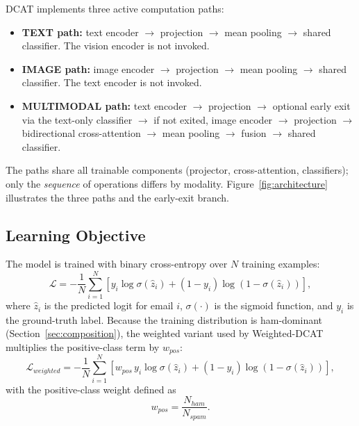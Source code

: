 \documentclass[10pt,twoside]{article}
\begin{document}
DCAT implements three active computation paths:

\begin{itemize}
\item \textbf{TEXT path:} text encoder $\rightarrow$ projection $\rightarrow$ mean pooling $\rightarrow$ shared classifier. The vision encoder is not invoked.
\item \textbf{IMAGE path:} image encoder $\rightarrow$ projection $\rightarrow$ mean pooling $\rightarrow$ shared classifier. The text encoder is not invoked.
\item \textbf{MULTIMODAL path:} text encoder $\rightarrow$ projection $\rightarrow$ optional early exit via the text-only classifier $\rightarrow$ if not exited, image encoder $\rightarrow$ projection $\rightarrow$ bidirectional cross-attention $\rightarrow$ mean pooling $\rightarrow$ fusion $\rightarrow$ shared classifier.
\end{itemize}

The paths share all trainable components (projector, cross-attention, classifiers); only the \emph{sequence} of operations differs by modality. Figure~\ref{fig:architecture} illustrates the three paths and the early-exit branch.

\subsection{Learning Objective}\label{sec:objective}

The model is trained with binary cross-entropy over $N$ training examples:
\begin{equation}\label{eq:bce}
\mathcal{L} = -\frac{1}{N} \sum_{i=1}^{N} \left[ y_i \log \sigma(\hat{z}_i) + (1 - y_i) \log \left( 1 - \sigma(\hat{z}_i) \right) \right],
\end{equation}
where $\hat{z}_i$ is the predicted logit for email $i$, $\sigma(\cdot)$ is the sigmoid function, and $y_i$ is the ground-truth label. Because the training distribution is ham-dominant (Section~\ref{sec:composition}), the weighted variant used by Weighted-DCAT multiplies the positive-class term by $w_{pos}$:
\begin{equation}\label{eq:loss-weighted}
\mathcal{L}_{weighted} = -\frac{1}{N} \sum_{i=1}^{N} \left[ w_{pos}\, y_i \log \sigma(\hat{z}_i) + (1 - y_i) \log \left( 1 - \sigma(\hat{z}_i) \right) \right],
\end{equation}
with the positive-class weight defined as
\begin{equation}\label{eq:wpos}
w_{pos} = \frac{N_{ham}}{N_{spam}}.
\end{equation}
\end{document}

